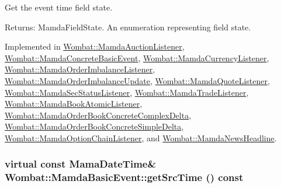 Get the event time field state. 

\begin{Desc}
\item[Returns:]Mamda\-Field\-State. An enumeration representing field state. \end{Desc}


Implemented in \hyperlink{classWombat_1_1MamdaAuctionListener_c156f3f2735c0064ac4bafe6e6ad7eac}{Wombat::Mamda\-Auction\-Listener}, \hyperlink{classWombat_1_1MamdaConcreteBasicEvent_9c45716bd83bba7832a3651bda399443}{Wombat::Mamda\-Concrete\-Basic\-Event}, \hyperlink{classWombat_1_1MamdaCurrencyListener_88df072f42678a7b2bb71e6c88e97dac}{Wombat::Mamda\-Currency\-Listener}, \hyperlink{classWombat_1_1MamdaOrderImbalanceListener_b9da1457422c7e005b4d1cb097621e01}{Wombat::Mamda\-Order\-Imbalance\-Listener}, \hyperlink{classWombat_1_1MamdaOrderImbalanceUpdate_ba5f05bfc7bc6b771c670b9184db39d0}{Wombat::Mamda\-Order\-Imbalance\-Update}, \hyperlink{classWombat_1_1MamdaQuoteListener_b401d95157253e35d0465c5cdb4f7da0}{Wombat::Mamda\-Quote\-Listener}, \hyperlink{classWombat_1_1MamdaSecStatusListener_facf6d5f611fb76e7e3e1e181f0b0d89}{Wombat::Mamda\-Sec\-Status\-Listener}, \hyperlink{classWombat_1_1MamdaTradeListener_db4c54a4b13c5cff7a25f15d524fbcd8}{Wombat::Mamda\-Trade\-Listener}, \hyperlink{classWombat_1_1MamdaBookAtomicListener_db8ff2c8d4bcbf00307474add61e741e}{Wombat::Mamda\-Book\-Atomic\-Listener}, \hyperlink{classWombat_1_1MamdaOrderBookConcreteComplexDelta_4242850f2f309e4d770db4734b89254d}{Wombat::Mamda\-Order\-Book\-Concrete\-Complex\-Delta}, \hyperlink{classWombat_1_1MamdaOrderBookConcreteSimpleDelta_00da14e2c14ad95ab8484bce70ba6536}{Wombat::Mamda\-Order\-Book\-Concrete\-Simple\-Delta}, \hyperlink{classWombat_1_1MamdaOptionChainListener_8942c3987173fa87ec07f38cba68fc15}{Wombat::Mamda\-Option\-Chain\-Listener}, and \hyperlink{classWombat_1_1MamdaNewsHeadline_bf7d4aed46483085ed6a4eac39d2f142}{Wombat::Mamda\-News\-Headline}.\hypertarget{classWombat_1_1MamdaBasicEvent_60b5d51f3799c4762090505ef5b213e9}{
\subsubsection[getSrcTime]{\setlength{\rightskip}{0pt plus 5cm}virtual const Mama\-Date\-Time\& Wombat::Mamda\-Basic\-Event::get\-Src\-Time () const}}
\label{classWombat_1_1MamdaBasicEvent_60b5d51f3799c4762090505ef5b213e9}


